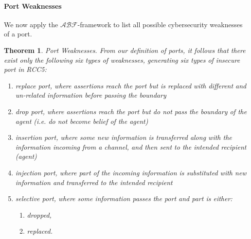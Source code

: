 \documentclass[conference]{IEEEtran}
\newcommand{\fixnote}[2]{\textbf{\color{red}{FIX}}\footnote{{\bf #1:} #2}}
\newcommand{\assertionRegion}{\mathcal{A}}
\newcommand{\beliefRegion}{\mathcal{B}}
\newcommand{\factRegion}{\mathcal{F}}
\newcommand{\abftheory}{\assertionRegion\beliefRegion\factRegion}
\newcommand{\rassert}[3]{\mathcal{A}_{#1\rightarrow #2}#3}
\newtheorem{definition}{Definition}%
\newtheorem{theorem}{Theorem}%
\begin{document}

\paragraph{Port Weaknesses} We now apply the $\abftheory$-framework to
list all possible cybersecurity weaknesses of a port.
\begin{theorem}{Port Weaknesses.}
From our definition of ports, it follows that there exist only the following \emph{six}
types of weaknesses, generating six types of insecure port in RCC5:
\begin{enumerate}[start=1, label={W\arabic*)}]
	\item \emph{replace port}, where assertions reach
		the port but is replaced with different and un-related information
		before passing the boundary 
	\item \emph{drop port}, where assertions reach the
		port but do not pass the boundary of the agent (i.e. do not
		become belief of the agent)
	\item \emph{insertion port}, where some new information is transferred along with 
		the information incoming from a channel, and then sent to
		the intended recipient (agent)
	\item \emph{injection port}, where part of the incoming information
		is substituted with new information and transferred to the intended recipient
	\item \emph{selective port}, where some information passes the port and
		part is either:
	\begin{enumerate}[start=1, label={W5.\arabic*)}]
		\item dropped, 
		\item replaced.
	\end{enumerate}
\end{enumerate}
\end{theorem}
\end{document}
